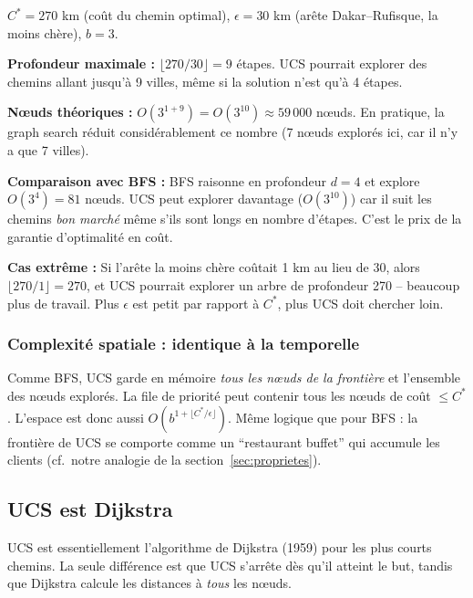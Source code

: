 \documentclass[11pt,a4paper]{article}
\begin{document}
\begin{exemplebox}
$C^* = 270$ km (coût du chemin optimal), $\epsilon = 30$ km (arête Dakar--Rufisque, la moins chère), $b = 3$.

\textbf{Profondeur maximale :} $\lfloor 270/30 \rfloor = 9$ étapes. UCS pourrait explorer des chemins allant jusqu'à 9 villes, même si la solution n'est qu'à 4 étapes.

\textbf{Nœuds théoriques :} $O(3^{1+9}) = O(3^{10}) \approx 59\,000$ nœuds. En pratique, la graph search réduit considérablement ce nombre (7 nœuds explorés ici, car il n'y a que 7 villes).

\textbf{Comparaison avec BFS :} BFS raisonne en profondeur $d = 4$ et explore $O(3^4) = 81$ nœuds. UCS peut explorer davantage ($O(3^{10})$) car il suit les chemins \textit{bon marché} même s'ils sont longs en nombre d'étapes. C'est le prix de la garantie d'optimalité en coût.

\textbf{Cas extrême :} Si l'arête la moins chère coûtait 1 km au lieu de 30, alors $\lfloor 270/1 \rfloor = 270$, et UCS pourrait explorer un arbre de profondeur 270 -- beaucoup plus de travail. Plus $\epsilon$ est petit par rapport à $C^*$, plus UCS doit chercher loin.
\end{exemplebox}

\subsubsection*{Complexité spatiale : identique à la temporelle}

Comme BFS, UCS garde en mémoire \textit{tous les nœuds de la frontière} et l'ensemble des nœuds explorés. La file de priorité peut contenir tous les nœuds de coût $\leq C^*$. L'espace est donc aussi $O(b^{1+\lfloor C^*/\epsilon \rfloor})$. Même logique que pour BFS : la frontière de UCS se comporte comme un ``restaurant buffet'' qui accumule les clients (cf.\ notre analogie de la section~\ref{sec:proprietes}).

\subsection{UCS est Dijkstra}

UCS est essentiellement l'algorithme de Dijkstra (1959) pour les plus courts chemins. La seule différence est que UCS s'arrête dès qu'il atteint le but, tandis que Dijkstra calcule les distances à \textit{tous} les nœuds.

\end{document}
